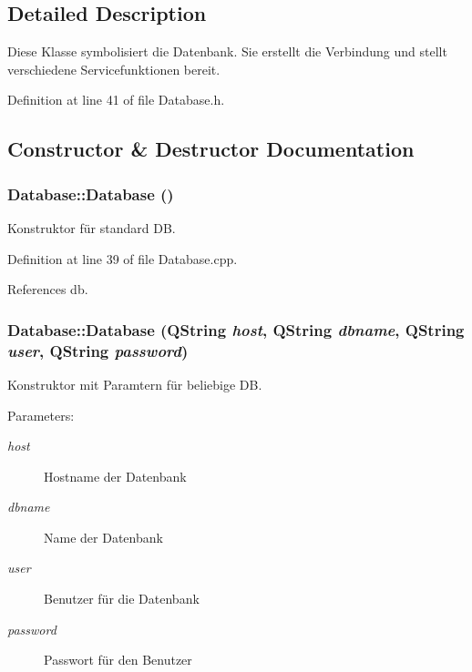 \subsection{Detailed Description}
Diese Klasse symbolisiert die Datenbank. Sie erstellt die Verbindung und stellt verschiedene Servicefunktionen bereit. 

Definition at line 41 of file Database.h.

\subsection{Constructor \& Destructor Documentation}
\hypertarget{class_database_4703c80e6969d33565ea340f768fdadf}{
\subsubsection[Database]{\setlength{\rightskip}{0pt plus 5cm}Database::Database ()}}
\label{class_database_4703c80e6969d33565ea340f768fdadf}


Konstruktor für standard DB. 



Definition at line 39 of file Database.cpp.

References db.\hypertarget{class_database_00afd5df356bd7a1f65f7e5f097486ae}{
\subsubsection[Database]{\setlength{\rightskip}{0pt plus 5cm}Database::Database (QString {\em host}, \/  QString {\em dbname}, \/  QString {\em user}, \/  QString {\em password})}}
\label{class_database_00afd5df356bd7a1f65f7e5f097486ae}


Konstruktor mit Paramtern für beliebige DB. 

\begin{Desc}
\item[Parameters:]
\begin{description}
\item[{\em host}]Hostname der Datenbank \item[{\em dbname}]Name der Datenbank \item[{\em user}]Benutzer für die Datenbank \item[{\em password}]Passwort für den Benutzer \end{description}
\end{Desc}


